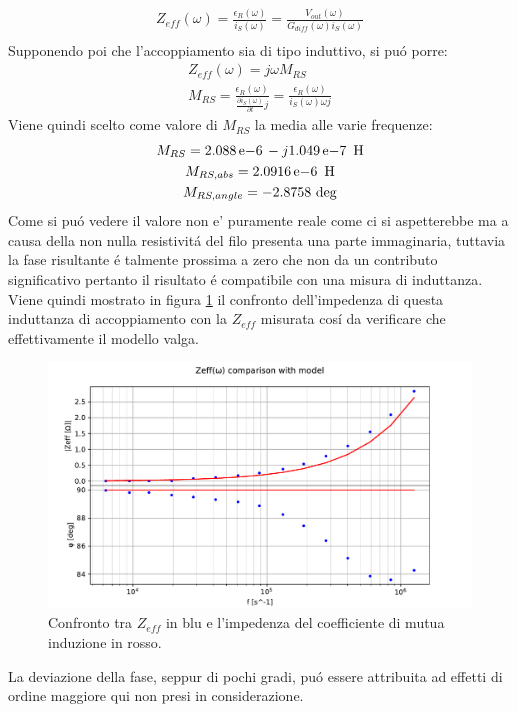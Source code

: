 \begin{gather}
	Z_{eff}(\omega) = \frac{\epsilon_R(\omega)}{i_S(\omega)}= \frac{V_{out}(\omega)}{G_{diff}(\omega) i_S(\omega)} \\
\end{gather}
Supponendo poi che l'accoppiamento sia di tipo induttivo, si pu\'o porre:
\begin{gather}
	Z_{eff}(\omega)=j \omega M_{RS} \\
	M_{RS} = \frac{\epsilon_R(\omega)}{\frac{\partial i_S(\omega)}{\partial t} j} = \frac{\epsilon_R(\omega)}{i_S(\omega) \omega j}
\end{gather}
Viene quindi scelto come valore di $M_{RS}$ la media alle varie frequenze:
\begin{gather}
	M_{RS}= 2.088\E{-6}-j1.049\E{-7}\ \si{\henry} \\
	M_{RS,abs}=2.0916\E{-6}\ \si{\henry} \\
	M_{RS,angle}=-2.8758 \ \si{\deg}
\end{gather}
Come si pu\'o vedere il valore non e' puramente reale come ci si aspetterebbe ma a causa della non nulla resistivit\'a del filo presenta una parte immaginaria, tuttavia la fase risultante \'e talmente prossima a zero che non da un contributo significativo pertanto il risultato \'e compatibile con una misura di induttanza. \\
Viene quindi mostrato in figura \ref{fig:zeff} il confronto dell'impedenza di questa induttanza di accoppiamento con la $Z_{eff}$ misurata cos\'i da verificare che effettivamente il modello valga.
\begin{figure}[h]
	\centering
    \includegraphics[width=\textwidth]{Figure_15.pdf}
    
    \caption{Confronto tra $Z_{eff}$ in blu e l'impedenza del coefficiente di mutua induzione in rosso.}
    \label{fig:zeff}
\end{figure}
La deviazione della fase, seppur di pochi gradi, pu\'o essere attribuita ad effetti di ordine maggiore qui non presi in considerazione.\\


